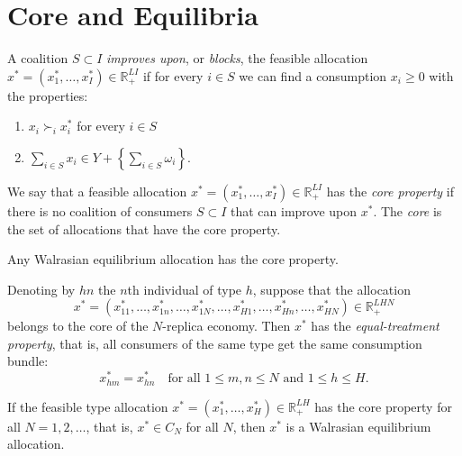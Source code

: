 \addtocounter{section}{1}

\section{Core and Equilibria}

\begin{defn}
    A coalition $S \subset I$ \emph{improves upon}, or \emph{blocks}, the feasible allocation $x^* = (x^*_1, \dots, x^*_I) \in \mathbb{R}^{LI}_+$ if for every $i \in S$ we can find a consumption $x_i \geq 0$ with the properties:
    \begin{enumerate}
        \item $x_i \succ_i x_i^*$ for every $i \in S$
        \item $\sum_{i \in S} x_i \in Y + \left\{\sum_{i \in S} \omega_i \right\}$.
    \end{enumerate}
\end{defn}

\begin{defn}
    We say that a feasible allocation $x^* = (x^*_1, \dots, x^*_I) \in \mathbb{R}^{LI}_+$ has the \emph{core property} if there is no coalition of consumers $S \subset I$ that can improve upon $x^*$. The \emph{core} is the set of allocations that have the core property.
\end{defn}

\begin{prop}
    Any Walrasian equilibrium allocation has the core property.
\end{prop}

\begin{prop}
    Denoting by $hn$ the $n$th individual of type $h$, suppose that the allocation
    \begin{equation*}
        x^* = (x^*_{11}, \dots, x^*_{1n}, \dots, x^*_{1N}, \dots, x^*_{H1}, \dots, x^*_{Hn}, \dots, x^*_{HN}) \in \mathbb{R}^{LHN}_+
    \end{equation*}
    belongs to the core of the $N$-replica economy. Then $x^*$ has the \emph{equal-treatment property}, that is, all consumers of the same type get the same consumption bundle:
    \begin{equation*}
        x^*_{hm} = x^*_{hn} \quad \text{for all } 1 \leq m, n \leq N \text{ and } 1 \leq h \leq H.
    \end{equation*}
\end{prop}

\begin{prop}
    If the feasible type allocation $x^* = (x^*_1, \dots, x^*_H) \in \mathbb{R}^{LH}_+$ has the core property for all $N = 1, 2, \dots$, that is, $x^* \in C_N$ for all $N$, then $x^*$ is a Walrasian equilibrium allocation.
\end{prop}



